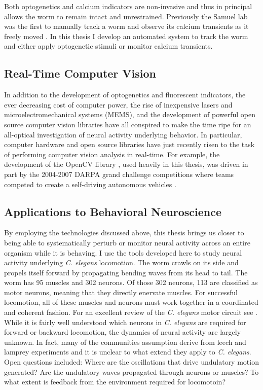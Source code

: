 Both optogenetics and calcium indicators are non-invasive and thus in principal allows the worm to remain intact and unrestrained. Previously the Samuel lab was the first to manually track a worm and observe its calcium transients as it freely moved \citep{clark_temporal_2007}. In this thesis I develop an automated system to track the worm and either apply optogenetic stimuli or monitor calcium transients.



\subsection{Real-Time Computer Vision}
In addition to the development of optogenetics and fluorescent indicators, the ever decreasing cost of computer power, the rise of inexpensive lasers and microelectromechanical systems (MEMS), and the development of powerful open source computer vision libraries have  all conspired to make the time ripe for an all-optical investigation of neural activity underlying behavior. In particular, computer hardware and open source libraries have just recently risen to the task of performing computer vision analysis in real-time. For example, the development of the OpenCV library \citep{bradski_opencv_2000,bradski_learning_2008}, used heavily in this thesis, was driven in part by the 2004-2007 DARPA grand challenge competitions where teams competed to create a self-driving autonomous vehicles \citep{stavens_learning_2011,buehler_stanley:_2007}.



\subsection{Applications to Behavioral Neuroscience}

By employing the technologies discussed above, this thesis brings us closer to being able to systematically perturb or monitor neural activity across an entire organism while it is behaving. I use the tools developed here to study  neural activity underlying \emph{C. elegans} locomotion. The worm crawls on its side and propels itself forward by propagating bending waves from its head to tail.  The worm has 95 muscles and 302 neurons. Of those 302 neurons, 113 are classified as motor neurons, meaning that they directly enervate muscles. For successful locomotion, all of these muscles and neurons must work together in a coordinated and coherent fashion. For an excellent review of the \textit{C. elegans}  motor circuit see \citep{von_stetina_motor_2006}. While it is fairly well understood which neurons  in \textit{C. elegans} are required for forward or backward locomotion, the dynamics of neural activity are largely unknown. In fact, many of the communities assumption derive from leech and lamprey experiments \citep{friesen_sensory_2001, karbowski_systems_2008} and it is unclear to what extend they apply to \textit{C. elegans}. Open questions included: Where are the oscillations that drive undulatory motion generated? Are the undulatory waves propagated through neurons or muscles? To what extent is  feedback from the environment required for locomotoin? 

